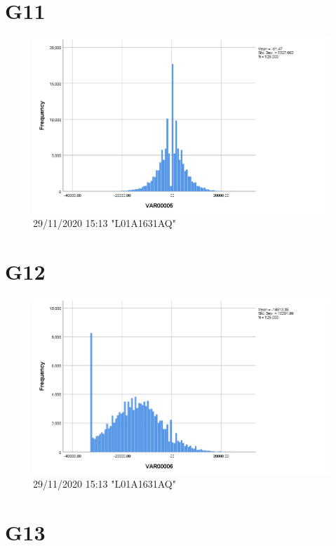 \documentclass[hidelinks, 12pt, a4paper]{article}
\begin{document}
\section{G11}

\begin{figure}[h!]
\centering
	\includegraphics[height=.38\textheight, width=\textwidth]{assets/session2/g11.png}
    \caption{29/11/2020 15:13 "L01A1631AQ"}
\end{figure}

\section{G12}

\begin{figure}[h!]
	\centering
		\includegraphics[height=.38\textheight, width=\textwidth]{assets/session2/g12.png}
    \caption{29/11/2020 15:13 "L01A1631AQ"}
	\end{figure}

\section{G13}
\end{document}
